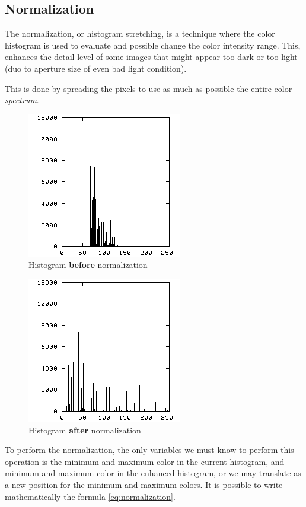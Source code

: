 \documentclass{article}
\begin{document}
	\subsection{Normalization}
		
		The normalization, or histogram stretching, is a technique where the color histogram is used to evaluate and possible change
		the color intensity range. This, enhances the detail level of some images that might appear too dark or too light (duo to aperture size of even
		bad light condition).

		This is done by spreading the pixels to use as much as possible the entire color \textit{spectrum}.
		
		\begin{figure} [H]
			\centering
			\includegraphics[scale=0.5]{images/histogram_1}
			\caption{Histogram \textbf{before} normalization\label{histogram_1}}
		\end{figure}

		\begin{figure} [H]
			\centering
			\includegraphics[scale=0.5]{images/histogram_2}
			\caption{Histogram \textbf{after} normalization\label{histogram_2}}
		\end{figure}

		To perform the normalization, the only variables we must know to perform this operation is the minimum and maximum color in the current histogram, 
		and minimum and maximum color in the enhanced histogram, or we may translate as a new position for the minimum and maximum colors. It is possible
		to write mathematically the formula \ref{eq:normalization}.
\end{document}
